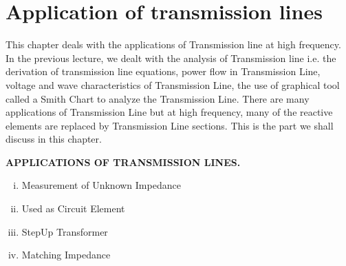\chapter{Application of transmission lines}\label{lec:lec10}
This chapter deals with the applications of Transmission line at high frequency. In the previous lecture, we dealt with the
analysis of Transmission line i.e. the derivation of transmission line equations, power flow in Transmission Line, voltage and wave characteristics of Transmission Line, the use of graphical tool called a Smith Chart to analyze the Transmission Line.
There are many applications of Transmission Line but at high frequency, many of the reactive elements are replaced by Transmission Line sections. This is the part we shall discuss in this chapter.

\textbf{APPLICATIONS OF TRANSMISSION LINES.}
\begin{enumerate}[(i)]
\item Measurement of Unknown Impedance 
\item Used as Circuit Element
\item StepUp Transformer 
\item Matching Impedance
\end{enumerate}

